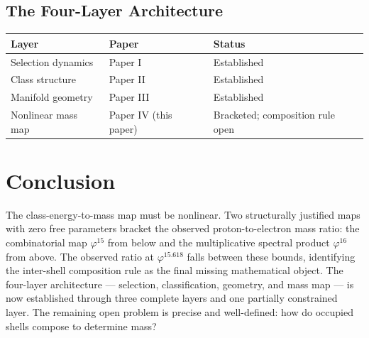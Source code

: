 \documentclass[12pt]{article}
\newcommand{\phig}{\varphi}
\begin{document}
\subsection{The Four-Layer Architecture}

\begin{table}[ht]
\centering
\begin{tabular}{@{}lll@{}}
\toprule
Layer & Paper & Status \\
\midrule
Selection dynamics & Paper I & Established \\
Class structure & Paper II & Established \\
Manifold geometry & Paper III & Established \\
Nonlinear mass map & Paper IV (this paper) & Bracketed; composition rule open \\
\bottomrule
\end{tabular}
\end{table}

\section{Conclusion}

The class-energy-to-mass map must be nonlinear. Two structurally justified maps with zero free parameters bracket the observed proton-to-electron mass ratio: the combinatorial map $\phig^{15}$ from below and the multiplicative spectral product $\phig^{16}$ from above. The observed ratio at $\phig^{15.618}$ falls between these bounds, identifying the inter-shell composition rule as the final missing mathematical object. The four-layer architecture --- selection, classification, geometry, and mass map --- is now established through three complete layers and one partially constrained layer. The remaining open problem is precise and well-defined: how do occupied shells compose to determine mass?



\end{document}
